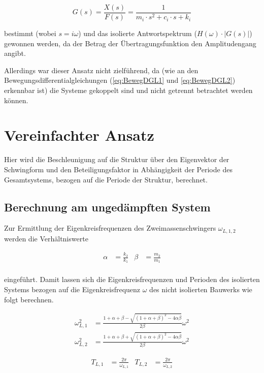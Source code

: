 \begin{equation} \label{laplace2}
G(s)=\frac{X(s)}{F(s)} = \frac{1}{m_i \cdot s^2 + c_i \cdot s + k_i}
\end{equation}

bestimmt (wobei $s = i \omega$) und das isolierte Antwortspektrum ($H(\omega) \cdot |G(s)|$) gewonnen werden, da der Betrag der Übertragungsfunktion den Amplitudengang angibt.

Allerdings war dieser Ansatz nicht zielführend, da (wie an den Bewegungsdifferentialgleichungen (\cref{eq:BewegDGL1} und \cref{eq:BewegDGL2}) erkennbar ist) die Systeme gekoppelt sind und nicht getrennt betrachtet werden können.

\section{Vereinfachter Ansatz}
\label{sec:ansatzvereinfacht}

Hier wird die Beschleunigung auf die Struktur über den Eigenvektor der Schwingform und den Beteiligungsfaktor in Abhängigkeit der Periode des Gesamtsystems, bezogen auf die Periode der Struktur, berechnet.

\subsection{Berechnung am ungedämpften System}

Zur Ermittlung der Eigenkreisfrequenzen des Zweimassenschwingers $\omega_{L,1,2}$ werden die Verhältniswerte

\begin{align}
\alpha &= \frac{k_2}{k_1} & \beta  &= \frac{m_2}{m_1} \\
\end{align}

eingeführt. Damit lassen sich die Eigenkreisfrequenzen und Perioden des isolierten Systems bezogen auf die Eigenkreisfrequenz $\omega$ des nicht isolierten Bauwerks wie folgt berechnen. \cite{Pocanschi} \cite{Isemann}

\begin{align}
\omega_{L,1}^2 &= \frac{1 + \alpha + \beta - \sqrt{(1 + \alpha + \beta)^2 - 4 \alpha \beta}}{2 \beta} \omega^2\\
\omega_{L,2}^2 &= \frac{1 + \alpha + \beta + \sqrt{(1 + \alpha + \beta)^2 - 4 \alpha \beta}}{2 \beta} \omega^2
\end{align}

\begin{align}
T_{L,1} &= \frac{2 \pi}{\omega_{L,1}} & T_{L,2} &= \frac{2 \pi}{\omega_{L,2}}
\end{align}

